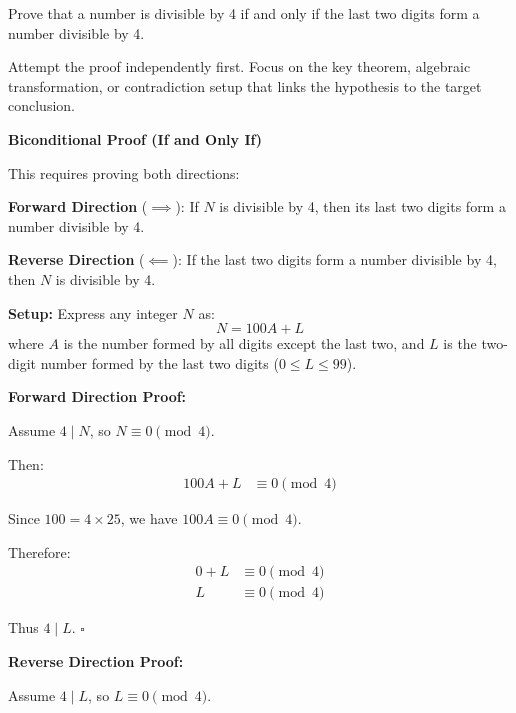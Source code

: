 
\begin{problem}
Prove that a number is divisible by 4 if and only if the last two digits form a number divisible by 4.
\end{problem}

\begin{hint}
Attempt the proof independently first. Focus on the key theorem, algebraic transformation, or contradiction setup that links the hypothesis to the target conclusion.
\end{hint}

\begin{solution}
\textbf{Biconditional Proof (If and Only If)}

This requires proving both directions:

\textbf{Forward Direction} ($\implies$): If $N$ is divisible by 4, then its last two digits form a number divisible by 4.

\textbf{Reverse Direction} ($\impliedby$): If the last two digits form a number divisible by 4, then $N$ is divisible by 4.

\vspace{0.5em}
\textbf{Setup:} Express any integer $N$ as:
\[ N = 100A + L \]
where $A$ is the number formed by all digits except the last two, and $L$ is the two-digit number formed by the last two digits ($0 \leq L \leq 99$).

\vspace{0.5em}
\textbf{Forward Direction Proof:}

Assume $4 \mid N$, so $N \equiv 0 \pmod{4}$.

Then:
\begin{align*}
    100A + L &\equiv 0 \pmod{4}
\end{align*}

Since $100 = 4 \times 25$, we have $100A \equiv 0 \pmod{4}$.

Therefore:
\begin{align*}
    0 + L &\equiv 0 \pmod{4} \\
    L &\equiv 0 \pmod{4}
\end{align*}

Thus $4 \mid L$. \hfill $\square$

\vspace{0.5em}
\textbf{Reverse Direction Proof:}

Assume $4 \mid L$, so $L \equiv 0 \pmod{4}$.


\end{solution}
